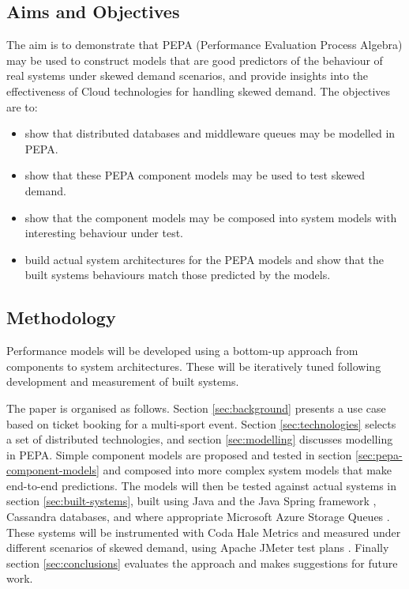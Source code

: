 \documentclass[runningheads]{llncs}
\begin{document}
\subsection{Aims and Objectives}

The aim is to demonstrate that PEPA (Performance Evaluation Process Algebra) \cite{RN1051} may be used to construct models that are good predictors of the behaviour of real systems under skewed demand scenarios, and provide insights into the effectiveness of Cloud technologies for handling skewed demand.  The objectives are to:
\begin{itemize}
	\item show that distributed databases and middleware queues may be modelled in PEPA.
	\item show that these PEPA component models may be used to test skewed demand.
	\item show that the component models may be composed into system models with interesting behaviour under test.
	\item build actual system architectures for the PEPA models and show that the built systems behaviours match those predicted by the models.
\end{itemize}

\subsection{Methodology}

Performance models will be developed using a bottom-up approach from components to system architectures.  These will be iteratively tuned following development and measurement of built systems.

The paper is organised as follows.  Section \ref{sec:background} presents a use case based on ticket booking for a multi-sport event.  Section \ref{sec:technologies} selects a set of distributed technologies, and section \ref{sec:modelling} discusses modelling in PEPA.  Simple component models are proposed and tested in section \ref{sec:pepa-component-models} and composed into more complex system models that make end-to-end predictions.
The models will then be tested against actual systems in section \ref{sec:built-systems}, built using Java and the Java Spring framework \cite{RN1076}, Cassandra \cite{RN1075,RN1050} databases, and where appropriate Microsoft Azure Storage Queues \cite{RN1072}.  These systems will be instrumented with Coda Hale Metrics \cite{RN1079} and measured under different scenarios of skewed demand, using Apache JMeter test plans \cite{RN1074}.  Finally section \ref{sec:conclusions} evaluates the approach and makes suggestions for future work.
\end{document}

